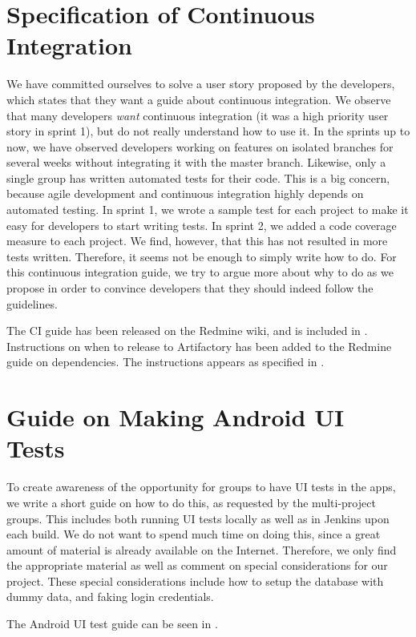 \section{Specification of Continuous Integration}
We have committed ourselves to solve a user story proposed by the developers, which states that they want a guide about continuous integration. We observe that many developers \emph{want} continuous integration (it was a high priority user story in sprint 1), but do not really understand how to use it. In the sprints up to now, we have observed developers working on features on isolated branches for several weeks without integrating it with the master branch. Likewise, only a single group has written automated tests for their code. This is a big concern, because agile development and continuous integration highly depends on automated testing. In sprint 1, we wrote a sample test for each project to make it easy for developers to start writing tests. In sprint 2, we added a code coverage measure to each project. We find, however, that this has not resulted in more tests written. Therefore, it seems not be enough to simply write how to do. For this continuous integration guide, we try to argue more about why to do as we propose in order to convince developers that they should indeed follow the guidelines.

The CI guide has been released on the Redmine wiki, and is included in . Instructions on when to release to Artifactory has been added to the Redmine guide on dependencies. The instructions appears as specified in .

\section{Guide on Making Android UI Tests}
To create awareness of the opportunity for groups to have UI tests in the apps, we write a short guide on how to do this, as requested by the multi-project groups. This includes both running UI tests locally as well as in Jenkins upon each build. We do not want to spend much time on doing this, since a great amount of material is already available on the Internet. Therefore, we only find the appropriate material as well as comment on special considerations for our project. These special considerations include how to setup the database with dummy data, and faking login credentials.

The Android UI test guide can be seen in .